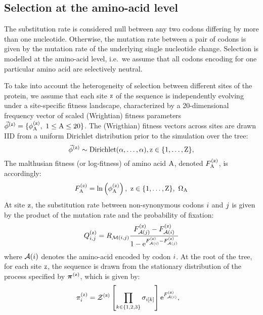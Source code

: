 \subsection{Selection at the amino-acid level}
\label{sec:mut-bias-aa-selection}

The substitution rate is considered null between any two codons differing by more than one nucleotide.
Otherwise, the mutation rate between a pair of codons is given by the mutation rate of the underlying single nucleotide change.
Selection is modelled at the amino-acid level, i.e.~we assume that all codons encoding for one particular amino acid are selectively neutral.

To take into account the heterogeneity of selection between different sites of the protein, we assume that each site $\text{z}$ of the sequence is independently evolving under a site-specific fitness landscape, characterized by a 20-dimensional frequency vector of scaled (Wrightian) fitness parameters $\vec{\phi}^{(\text{z})} = \{ \phi^{(\text{z})}_{\text{A}},\ 1 \leq \text{A} \leq 20 \}$.
The (Wrigthian) fitness vectors across sites are drawn IID from a uniform Dirichlet distribution prior to the simulation over the tree:
\begin{equation}
    \vec{\phi}^{(\text{z})} \sim \text{Dirichlet} (\alpha, \hdots, \alpha), \text{z} \in \{1, \hdots, \text{Z}\},
\end{equation}
The malthusian fitness (or log-fitness) of amino acid $\text{A}$, denoted $F^{(\text{z})}_{\text{A}}$, is accordingly:
\begin{equation}
    F^{(\text{z})}_{\text{A}} = \ln \left( \phi^{(\text{z})}_{\text{A}} \right),\ \text{z} \in \{1, \hdots, \text{Z}\}, \ \Omega_{\text{A}}
\end{equation}
At site $\text{z}$, the substitution rate between non-synonymous codons ${i}$ and ${j}$ is given by the product of the mutation rate and the probability of fixation:
\begin{equation}
    Q_{{i}, {j}}^{(\text{z})} = R_{\mathcal{M}({i}, {j})} \dfrac{F_{\mathcal{A}({j})}^{(\text{z})} - F_{\mathcal{A}({i})}^{(\text{z})}}{1 - \text{e}^{F_{\mathcal{A}({i})}^{(\text{z})} - F_{\mathcal{A}({j})}^{(\text{z})}} } \label{eq:codonsubrates}
\end{equation}
where $\mathcal{A}({i})$ denotes the amino-acid encoded by codon ${i}$.
At the root of the tree, for each site $\text{z}$, the sequence is drawn from the stationary distribution of the process specified by $\bm{\pi}^{(\text{z})}$, which is given by:
\begin{align}
    \pi_{{i}}^{(\text{z})} & = \mathcal{Z}^{(\text{z})} \left[\prod\limits_{k \in \{ 1, 2, 3 \}} \sigma_{{i}[k]}\right] \text{e}^{F_{\mathcal{A}({i})}^{(\text{z})}},
    \label{codonStationarity}
\end{align}
